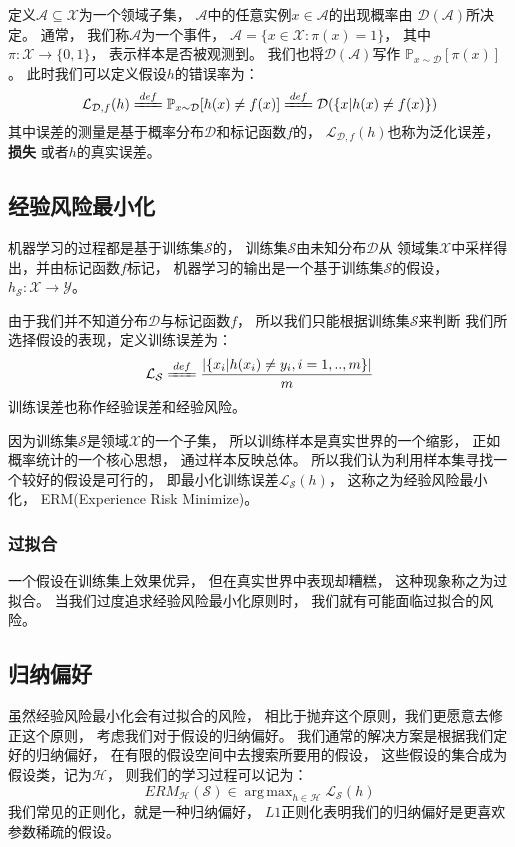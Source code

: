 \documentclass[UTF8]{ctexart}
\DeclareMathOperator*{\argmax}{arg\,max}
\begin{document}
定义$\mathcal{A}\subseteq\mathcal{X}$为一个领域子集，
$\mathcal{A}$中的任意实例$x\in\mathcal{A}$的出现概率由
$\mathcal{D}(\mathcal{A})$所决定。
通常，
我们称$\mathcal{A}$为一个事件，
$\mathcal{A}=\{x\in\mathcal{X}:\pi(x)=1\}$，
其中$\pi:\mathcal{X}\rightarrow\{0,1\}$，
表示样本是否被观测到。
我们也将$\mathcal{D}(\mathcal{A})$写作
$\mathbb{P}_{x\sim\mathcal{D}} [\pi(x)]$。
此时我们可以定义假设$h$的错误率为：
$$
\mathcal{L}_{\mathcal{D},f}(h)\xlongequal{def}
\mathbb{P}_{x\sim\mathcal{D}} [h(x)\neq f(x)]\xlongequal{def}
\mathcal{D}(\{x|h(x)\neq f(x)\})
$$
其中误差的测量是基于概率分布$\mathcal{D}$和标记函数$f$的，
$\mathcal{L}_{\mathcal{D},f}(h)$也称为泛化误差，
\textbf{损失}
或者$h$的真实误差。

\subsection{经验风险最小化}
机器学习的过程都是基于训练集$\mathcal{S}$的，
训练集$\mathcal{S}$由未知分布$\mathcal{D}$从
领域集$\mathcal{X}$中采样得出，并由标记函数$f$标记，
机器学习的输出是一个基于训练集$\mathcal{S}$的假设，
$h_{\mathcal{S}}:\mathcal{X}\rightarrow\mathcal{Y}$。

由于我们并不知道分布$\mathcal{D}$与标记函数$f$，
所以我们只能根据训练集$\mathcal{S}$来判断
我们所选择假设的表现，定义训练误差为：
$$
\mathcal{L}_{\mathcal{S}}\xlongequal{def}
\frac{|\{x_i|h(x_i)\neq y_i,i=1,..,m\}|}{m}
$$
训练误差也称作经验误差和经验风险。

因为训练集$\mathcal{S}$是领域$\mathcal{X}$的一个子集，
所以训练样本是真实世界的一个缩影，
正如概率统计的一个核心思想，
通过样本反映总体。
所以我们认为利用样本集寻找一个较好的假设是可行的，
即最小化训练误差$\mathcal{L}_{\mathcal{S}}(h)$，
这称之为经验风险最小化，
ERM(Experience Risk Minimize)。

\subsubsection{过拟合}
一个假设在训练集上效果优异，
但在真实世界中表现却糟糕，
这种现象称之为过拟合。
当我们过度追求经验风险最小化原则时，
我们就有可能面临过拟合的风险。

\subsection{归纳偏好}
虽然经验风险最小化会有过拟合的风险，
相比于抛弃这个原则，我们更愿意去修正这个原则，
考虑我们对于假设的归纳偏好。
我们通常的解决方案是根据我们定好的归纳偏好，
在有限的假设空间中去搜索所要用的假设，
这些假设的集合成为假设类，记为$\mathcal{H}$，
则我们的学习过程可以记为：
$$
{ERM}_{\mathcal{H}}(\mathcal{S})\in 
\argmax_{h\in\mathcal{H}}
\mathcal{L}_{\mathcal{S}}(h)
$$
我们常见的正则化，就是一种归纳偏好，
$L1$正则化表明我们的归纳偏好是更喜欢参数稀疏的假设。
\end{document}
